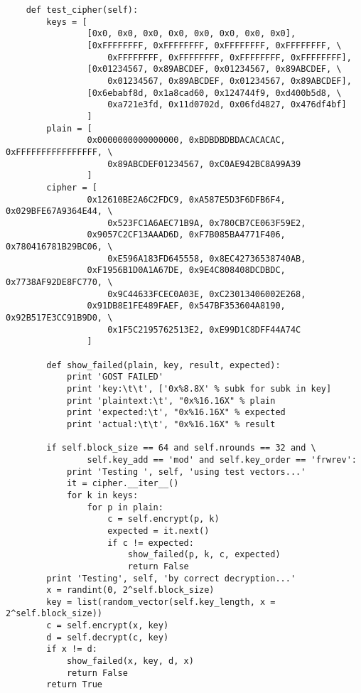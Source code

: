 \begin{appendices}
\begin{lstlisting}
    def test_cipher(self):
        keys = [
                [0x0, 0x0, 0x0, 0x0, 0x0, 0x0, 0x0, 0x0], 
                [0xFFFFFFFF, 0xFFFFFFFF, 0xFFFFFFFF, 0xFFFFFFFF, \
                    0xFFFFFFFF, 0xFFFFFFFF, 0xFFFFFFFF, 0xFFFFFFFF], 
                [0x01234567, 0x89ABCDEF, 0x01234567, 0x89ABCDEF, \
                    0x01234567, 0x89ABCDEF, 0x01234567, 0x89ABCDEF], 
                [0x6ebabf8d, 0x1a8cad60, 0x124744f9, 0xd400b5d8, \
                    0xa721e3fd, 0x11d0702d, 0x06fd4827, 0x476df4bf]
                ]
        plain = [
                0x0000000000000000, 0xBDBDBDBDACACACAC, 0xFFFFFFFFFFFFFFFF, \
                    0x89ABCDEF01234567, 0xC0AE942BC8A99A39
                ]
        cipher = [
                0x12610BE2A6C2FDC9, 0xA587E5D3F6DFB6F4, 0x029BFE67A9364E44, \
                    0x523FC1A6AEC71B9A, 0x780CB7CE063F59E2,
                0x9057C2CF13AAAD6D, 0xF7B085BA4771F406, 0x780416781B29BC06, \
                    0xE596A183FD645558, 0x8EC42736538740AB,
                0xF1956B1D0A1A67DE, 0x9E4C808408DCDBDC, 0x7738AF92DE8FC770, \
                    0x9C44633FCEC0A03E, 0xC23013406002E268,
                0x91DB8E1FE489FAEF, 0x547BF353604A8190, 0x92B517E3CC91B9D0, \
                    0x1F5C2195762513E2, 0xE99D1C8DFF44A74C
                ]

        def show_failed(plain, key, result, expected):
            print 'GOST FAILED'
            print 'key:\t\t', ['0x%8.8X' % subk for subk in key]
            print 'plaintext:\t', "0x%16.16X" % plain
            print 'expected:\t', "0x%16.16X" % expected
            print 'actual:\t\t', "0x%16.16X" % result

        if self.block_size == 64 and self.nrounds == 32 and \
                self.key_add == 'mod' and self.key_order == 'frwrev':
            print 'Testing ', self, 'using test vectors...'
            it = cipher.__iter__()
            for k in keys:
                for p in plain:
                    c = self.encrypt(p, k)
                    expected = it.next() 
                    if c != expected:
                        show_failed(p, k, c, expected)
                        return False
        print 'Testing', self, 'by correct decryption...'
        x = randint(0, 2^self.block_size)
        key = list(random_vector(self.key_length, x = 2^self.block_size))
        c = self.encrypt(x, key)
        d = self.decrypt(c, key)
        if x != d:
            show_failed(x, key, d, x)
            return False
        return True
\end{lstlisting}



\end{appendices}
